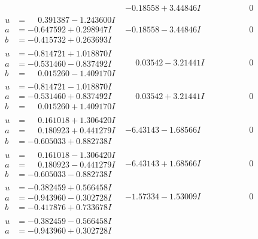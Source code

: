 \documentclass[1p]{elsarticle_modified}
\theoremstyle{definition}
\begin{document}
$$\begin{array}{c|c|c}
 & -0.18558 + 3.44846 I & \phantom{-0.000000 } 0 \\ \hline\begin{aligned}
u &= \phantom{-}0.391387 - 1.243600 I \\
a &= -0.647592 + 0.298947 I \\
b &= -0.415732 + 0.263693 I\end{aligned}
 & -0.18558 - 3.44846 I & \phantom{-0.000000 } 0 \\ \hline\begin{aligned}
u &= -0.814721 + 1.018870 I \\
a &= -0.531460 - 0.837492 I \\
b &= \phantom{-}0.015260 - 1.409170 I\end{aligned}
 & \phantom{-}0.03542 - 3.21441 I & \phantom{-0.000000 } 0 \\ \hline\begin{aligned}
u &= -0.814721 - 1.018870 I \\
a &= -0.531460 + 0.837492 I \\
b &= \phantom{-}0.015260 + 1.409170 I\end{aligned}
 & \phantom{-}0.03542 + 3.21441 I & \phantom{-0.000000 } 0 \\ \hline\begin{aligned}
u &= \phantom{-}0.161018 + 1.306420 I \\
a &= \phantom{-}0.180923 + 0.441279 I \\
b &= -0.605033 + 0.882738 I\end{aligned}
 & -6.43143 - 1.68566 I & \phantom{-0.000000 } 0 \\ \hline\begin{aligned}
u &= \phantom{-}0.161018 - 1.306420 I \\
a &= \phantom{-}0.180923 - 0.441279 I \\
b &= -0.605033 - 0.882738 I\end{aligned}
 & -6.43143 + 1.68566 I & \phantom{-0.000000 } 0 \\ \hline\begin{aligned}
u &= -0.382459 + 0.566458 I \\
a &= -0.943960 - 0.302728 I \\
b &= -0.417876 + 0.733678 I\end{aligned}
 & -1.57334 - 1.53009 I & \phantom{-0.000000 } 0 \\ \hline\begin{aligned}
u &= -0.382459 - 0.566458 I \\
a &= -0.943960 + 0.302728 I \\

\end{aligned}
\end{array}$$
\end{document}
